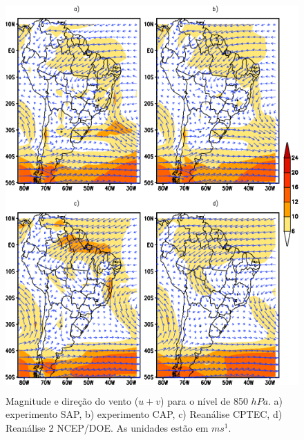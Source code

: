 \begin{figure}[!hbp]
\centering
\includegraphics[height=15cm]{./figs/media_ventos_anl_850hPa.png}
\caption{Magnitude e direção do vento ($u+v$) para o nível de 850 $hPa$. a) experimento SAP, b) experimento CAP, c) Reanálise CPTEC, d) Reanálise 2 NCEP/DOE. As unidades estão em $ms^{1}$.}
\label{fig17}
\end{figure}

